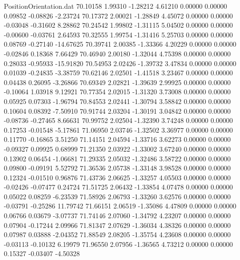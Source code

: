 \begin{filecontents}{PositionOrientation.dat}
  70.10158    1.99310   -1.28212     4.61210    0.00000    0.00000    0.09852   -0.08826   -2.23724
  70.17372    2.00021   -1.28849     4.45072    0.00000    0.00000   -0.03048   -0.31602    8.28862
  70.24542    1.99802   -1.31115     5.04502    0.00000    0.00000   -0.00600   -0.03761    2.64593
  70.32555    1.99754   -1.31416     5.25703    0.00000    0.00000    0.08769   -0.27140  -14.67625
  70.39741    2.00385   -1.33366     4.20229    0.00000    0.00000   -0.02846    0.18368    7.66429
  70.46940    2.00180   -1.32044     4.75398    0.00000    0.00000    0.28033   -0.95933  -15.91820
  70.54953    2.02426   -1.39732     3.47834    0.00000    0.00000    0.01039   -0.24835   -3.38759
  70.62146    2.02501   -1.41518     3.23467    0.00000    0.00000    0.04438    0.26095   -3.26866
  70.69349    2.02821   -1.39639     2.99925    0.00000    0.00000   -0.10064    1.03918    9.12921
  70.77354    2.02015   -1.31320     3.73008    0.00000    0.00000    0.05925    0.07303   -1.96794
  70.84553    2.02441   -1.30794     3.58842    0.00000    0.00000    0.10604    0.08392   -7.50910
  70.91744    2.03204   -1.30191     3.04842    0.00000    0.00000   -0.08736   -0.27465    8.66631
  70.99752    2.02504   -1.32390     3.74248    0.00000    0.00000    0.17253   -0.01548   -5.17861
  71.06950    2.03746   -1.32502     3.36977    0.00000    0.00000    0.11770   -0.16865    3.51250
  71.14151    2.04594   -1.33716     3.62273    0.00000    0.00000   -0.09327    0.09925    0.68999
  71.21350    2.03922   -1.33002     3.67240    0.00000    0.00000    0.13902    0.06454   -1.06681
  71.29335    2.05032   -1.32486     3.58722    0.00000    0.00000    0.09800   -0.09191    5.52792
  71.36536    2.05738   -1.33148     3.98528    0.00000    0.00000    0.12324   -0.01510    0.96876
  71.43736    2.06625   -1.33257     4.05503    0.00000    0.00000   -0.02426   -0.07477    0.24724
  71.51725    2.06432   -1.33854     4.07478    0.00000    0.00000    0.05022    0.08259   -6.23539
  71.58926    2.06793   -1.33260     3.62576    0.00000    0.00000   -0.03791   -0.25286   11.79742
  71.66151    2.06519   -1.35086     4.47809    0.00000    0.00000    0.06766    0.03679   -3.07737
  71.74146    2.07060   -1.34792     4.23207    0.00000    0.00000    0.07904   -0.17244    2.09966
  71.81347    2.07629   -1.36034     4.38326    0.00000    0.00000    0.07987    0.03888   -2.04352
  71.88549    2.08205   -1.35754     4.23608    0.00000    0.00000   -0.03113   -0.10132    6.19979
  71.96550    2.07956   -1.36565     4.73212    0.00000    0.00000    0.15327   -0.03407   -4.50328

\end{filecontents}
